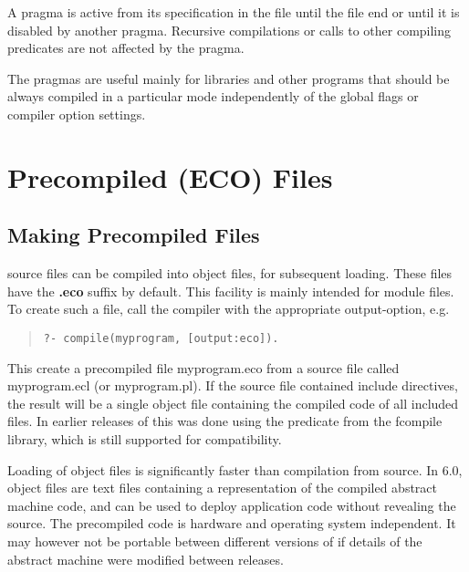 A pragma is active from its specification in the file
until the file end or until it is disabled by another pragma.
Recursive compilations or calls to other compiling predicates
are not affected by the pragma.

The pragmas are  useful mainly for libraries and other programs
that should be always compiled in a particular mode
independently of the global flags or compiler option settings.


\section{Precompiled (ECO) Files}

\subsection{Making Precompiled Files}
{\eclipse} source files can be compiled into {\eclipse} object files,
for subsequent loading. These files have the {\bf .eco} suffix
by default.
This facility is mainly intended for module files.
To create such a file, call the compiler with the
appropriate output-option, e.g.
\begin{quote}\begin{verbatim}
?- compile(myprogram, [output:eco]).
\end{verbatim}
\end{quote}
This create a precompiled file myprogram.eco from a source file called
myprogram.ecl (or myprogram.pl).  If the source file contained
include directives, the result will be a single object file containing
the compiled code of all included files.
In earlier releases of {\eclipse} this was done using the
predicate from the fcompile library,
which is still supported for compatibility.

Loading of {\eclipse} object files is significantly faster than compilation
from source.  In {\eclipse} 6.0, {\eclipse} object files are text files
containing a representation of the compiled abstract machine code, and
can be used to deploy application code without revealing the source.
The precompiled code is hardware and operating system independent.
It may however not be portable between different versions of {\eclipse}
if details of the abstract machine were modified between releases.

